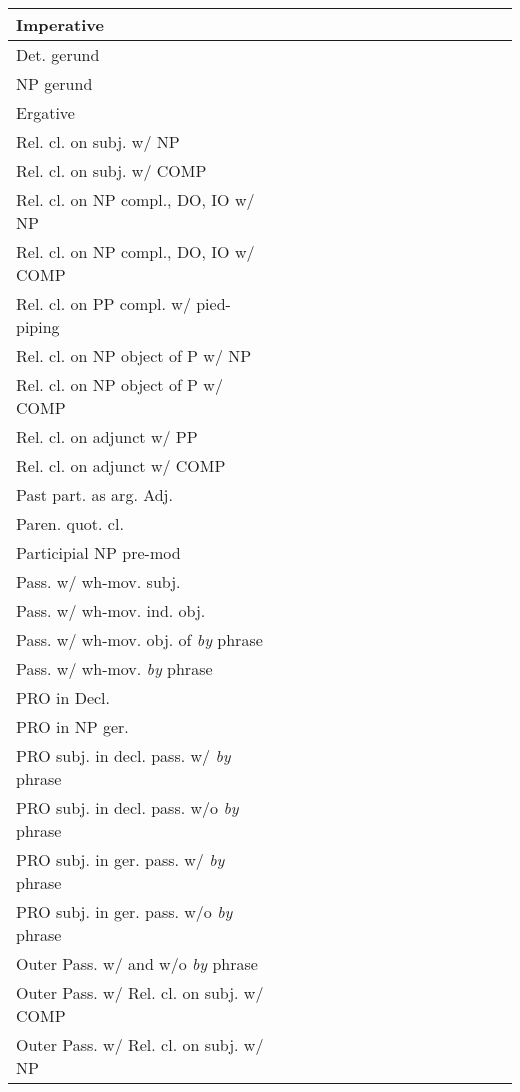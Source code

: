 \begin{center}
\begin{tabular}{|p{2.4in}||*{15}{c|}}
\hline
Imperative & & & & & & & & & & & & & & & \\
\hline
Det. gerund & & & & & & & & & & & & & & & \\
\hline
NP gerund & & & & & & & & & & & & & & & \\
\hline
Ergative & & & & & & & & & & & & & & & \\
\hline
Rel. cl. on subj. w/ NP & & & & & & & & & & & & & & & \\
\hline
Rel. cl. on subj. w/ COMP & & & & & & & & & & & & & & & \\
\hline
Rel. cl. on NP compl., DO, IO w/ NP & & & & & & & & & & & & & & & \\
\hline
Rel. cl. on NP compl., DO, IO w/ COMP & & & & & & & & & & & & & & & \\
\hline
Rel. cl. on PP compl. w/ pied-piping & & & & & & & & & & & & & & & \\
\hline
Rel. cl. on NP object of P w/ NP & & & & & & & & & & & & & & & \\
\hline
Rel. cl. on NP object of P w/ COMP & & & & & & & & & & & & & & & \\
\hline
Rel. cl. on adjunct w/ PP & & & & & & & & & & & & & & & \\
\hline
Rel. cl. on adjunct w/ COMP & & & & & & & & & & & & & & & \\
\hline
Past part. as arg. Adj. & & & & & & & & & & & & & & & \\
\hline
Paren. quot. cl. & & & & & & & & & & & & & & & \\
\hline
Participial NP pre-mod & & & & & & & & & & & & & & & \\
\hline
Pass. w/ wh-mov. subj. & & & & & & & & & & & & & & & \\
\hline
Pass. w/ wh-mov. ind. obj. & & & & & & & & & & & & & & & \\
\hline
Pass. w/ wh-mov. obj. of  {\it by} phrase & & & & & & & & & & & & & & & \\
\hline
Pass. w/ wh-mov. {\it by} phrase & & & & & & & & & & & & & & & \\
\hline
PRO in Decl. & & & & & & & & & & & & & & & \\
\hline
PRO in NP ger. & & & & & & & & & & & & & & & \\
\hline
PRO subj. in decl. pass. w/ {\it by} phrase & & & & & & & & & & & & & & & \\
\hline
PRO subj. in decl. pass. w/o {\it by} phrase & & & & & & & & & & & & & & & \\
\hline
PRO subj. in ger. pass. w/ {\it by} phrase & & & & & & & & & & & & & & & \\
\hline
PRO subj. in ger. pass. w/o {\it by} phrase & & & & & & & & & & & & & & & \\
\hline
Outer Pass. w/ and w/o {\it by} phrase & & & & & & & & & & & & & & & \\
\hline
Outer Pass. w/ Rel. cl. on subj. w/ COMP & & & & & & & & & & & & & & & \\
\hline
Outer Pass. w/ Rel. cl. on subj. w/ NP & & & & & & & & & & & & & & & \\
\hline
\end{tabular}
\end{center}


